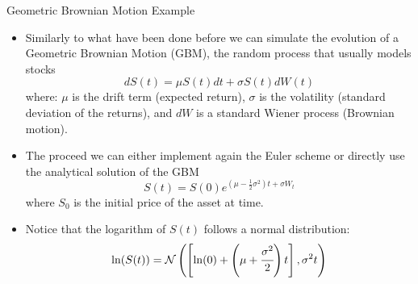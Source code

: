 \documentclass{beamer}
\begin{document}
\begin{frame}{Geometric Brownian Motion Example}
\begin{itemize}
    \item Similarly to what have been done before we can simulate the evolution of a Geometric Brownian Motion (GBM), the random process that usually models stocks
    \begin{equation*}
        dS(t) = \mu S(t) dt + \sigma S(t) dW(t)
    \end{equation*}
    where: $\mu$ is the drift term (expected return), $\sigma$ is the volatility (standard deviation of the returns), and $dW$ is a standard Wiener process (Brownian motion).
    \item The proceed we can either implement again the Euler scheme or directly use the analytical solution of the GBM
    \begin{equation*}
        S(t) = S(0)e^{(\mu-\frac{1}{2}\sigma^2)t+\sigma W_t}
    \end{equation*}
    where $S_0$ is the initial price of the asset at time.
    \item Notice that the logarithm of $S(t)$ follows a normal distribution:
    \begin{equation*}
        \ln(S(t)) = \mathcal{N}\left(\left[\ln(0) +\left(\mu +\cfrac{\sigma^2}{2}\right)t \right], \sigma^2 t\right)
    \end{equation*}
\end{itemize}
\end{frame}
\end{document}
